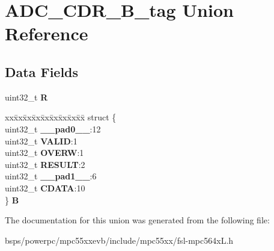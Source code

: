 \hypertarget{unionADC__CDR__32B__tag}{}\section{A\+D\+C\+\_\+\+C\+D\+R\+\_\+B\+\_\+tag Union Reference}
\label{unionADC__CDR__32B__tag}
\subsection*{Data Fields}
\begin{DoxyCompactItemize}
\item 
\mbox{\label{unionADC__CDR__32B__tag_ab295ccbc77e4fb2f00b0a1789c31e6f1}} 
uint32\+\_\+t {\bfseries R}
\item 
\mbox{\label{unionADC__CDR__32B__tag_a405ad72a44ea99715c40327afee8fd4c}} 
\begin{tabbing}
xx\=xx\=xx\=xx\=xx\=xx\=xx\=xx\=xx\=\kill
struct \{\\
\>uint32\_t {\bfseries \_\_pad0\_\_}:12\\
\>uint32\_t {\bfseries VALID}:1\\
\>uint32\_t {\bfseries OVERW}:1\\
\>uint32\_t {\bfseries RESULT}:2\\
\>uint32\_t {\bfseries \_\_pad1\_\_}:6\\
\>uint32\_t {\bfseries CDATA}:10\\
\} {\bfseries B}\\

\end{tabbing}\end{DoxyCompactItemize}


The documentation for this union was generated from the following file\+:\begin{DoxyCompactItemize}
\item 
bsps/powerpc/mpc55xxevb/include/mpc55xx/fsl-\/mpc564x\+L.\+h\end{DoxyCompactItemize}
